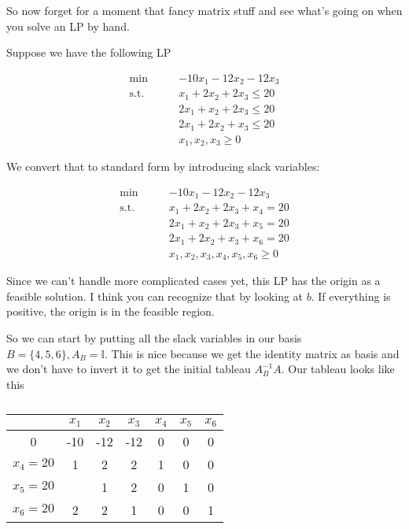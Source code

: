 \begin{Ex} So now forget for a moment that fancy matrix stuff and see what's going on when you solve an LP by hand.

Suppose we have the following LP

\begin{align*}
\min \qquad& -10 x_1 - 12 x_2 - 12 x_3\\
\text{s.t.}\qquad & x_1 + 2 x_2 +2 x_3 \leq 20\\
& 2x_1 + x_2 + 2 x_3\leq 20\\
& 2x_1 + 2 x_2 + x_3\leq 20\\
& x_1,x_2,x_3 \geq 0
\end{align*}

We convert that to standard form by introducing slack variables:

\begin{align*}
\min \qquad 	  & -10 x_1 -12 x_2 -12 x_3 \\
\text{s.t.}\qquad & x_1 + 2 x_2 + 2 x_3 + x_4 = 20\\
		  & 2x_1 + x_2 + 2 x_3 + x_5  = 20\\
		  & 2 x_1 + 2 x_2 + x_3 + x_6 = 20\\
		  & x_1,x_2,x_3,x_4,x_5,x_6   \geq 0
\end{align*}

Since we can't handle more complicated cases yet, this LP has the origin as a feasible solution. I think you can recognize that by looking at $b$. If everything is positive, the origin is in the feasible region.

So we can start by putting all the slack variables in our basis $B=\{4,5,6\}, A_B=\mathbb{I}$. This is nice because we get the identity matrix as basis and we don't have to invert it to get the initial tableau $A_B^{-1}A$. Our tableau looks like this

\begin{table}[hbt]
\begin{center}
\begin{tabular}{c|cccccc}
  & $x_1$ & $x_2$ & $x_3$ & $x_4$ & $x_5$ & $x_6$ \\\hline
0 & -10 & -12 & -12 & 0 & 0 & 0\\\hline
$x_4=20$ & 1 & 2 & 2 & 1 &  0 & 0 \\
$x_5=20$ & \cellcolor{gruen}{\bf 2} & 1 & 2 & 0 &  1 & 0\\
$x_6=20$ & 2 & 2 & 1 & 0 &  0 & 1\\
\end{tabular}
\end{center}
\caption*{}
\vspace{-1.3cm}
\label{tab:pivotExample}
\end{table}


\end{Ex}
